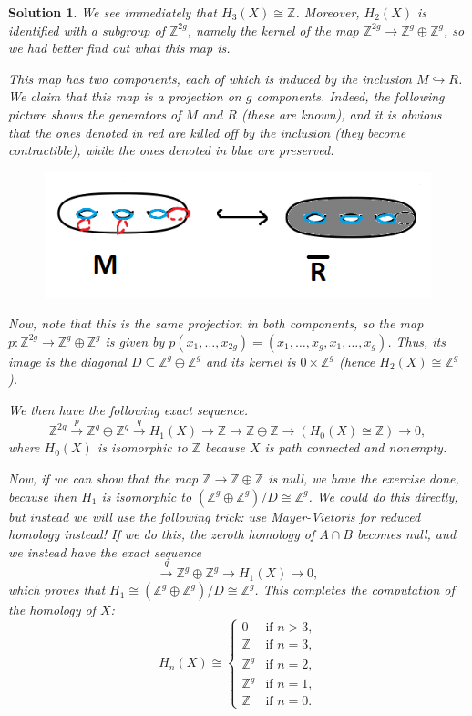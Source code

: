\documentclass{article}
\theoremstyle{plain}
\theoremstyle{nonumberplain}
\newtheorem{sol}{Solution}
\newcommand{\Z}{\mathbb{Z}}
\begin{document}
\begin{sol}
We see immediately that $H_3(X) \cong \Z$. Moreover, $H_2(X)$ is identified with a subgroup of $\Z^{2g}$, namely the kernel of the map $\Z^{2g} \to \Z^g \oplus \Z^g$, so we had better find out what this map is.

This map has two components, each of which is induced by the inclusion $M \hookrightarrow R$. We claim that this map is a projection on $g$ components. Indeed, the following picture shows the generators of $M$ and $R$ (these are known), and it is obvious that the ones denoted in red are killed off by the inclusion (they become contractible), while the ones denoted in blue are preserved.
\begin{figure}[H]
\centering
\includegraphics[width=\linewidth]{mt3_fix}
\end{figure}

Now, note that this is the same projection in both components, so the map $p \colon \Z^{2g} \to \Z^g \oplus \Z^g$ is given by $p(x_1, \dots, x_{2g}) = (x_1, \dots, x_g, x_1, \dots, x_g)$. Thus, its image is the diagonal $D \subseteq \Z^g \oplus \Z^g$ and its kernel is $0 \times \Z^g$ (hence $H_2(X) \cong \Z^g$).

We then have the following exact sequence.
\begin{equation}
\Z^{2g} \xrightarrow{p} \Z^g \oplus \Z^g \xrightarrow{q} H_1(X) \to \Z \to \Z \oplus \Z \to (H_0(X) \cong \Z) \to 0,
\end{equation}
where $H_0(X)$ is isomorphic to $\Z$ because $X$ is path connected and nonempty.

Now, if we can show that the map $\Z \to \Z \oplus \Z$ is null, we have the exercise done, because then $H_1$ is isomorphic to $(\Z^g \oplus \Z^g)/D \cong \Z^g$. We could do this directly, but instead we will use the following trick: use Mayer-Vietoris for reduced homology instead! If we do this, the zeroth homology of $A \cap B$ becomes null, and we instead have the exact sequence
\begin{equation}
\xrightarrow{q} \Z^g \oplus \Z^g \to H_1(X) \to 0,
\end{equation}
which proves that $H_1 \cong (\Z^g \oplus \Z^g)/D \cong \Z^{g}$. This completes the computation of the homology of $X$:
\begin{equation}
H_n(X) \cong \begin{cases}
0 & \text{if $n > 3$,}\\
\Z & \text{if $n = 3$,}\\
\Z^{g} & \text{if $n = 2$,}\\
\Z^{g} & \text{if $n = 1$,}\\
\Z & \text{if $n = 0$.}
\end{cases}
\end{equation}


\end{sol}
\end{document}
